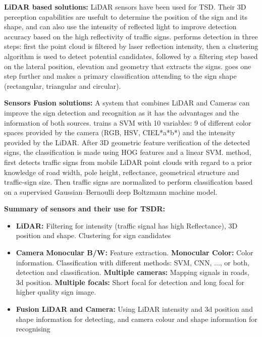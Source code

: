 \begin{flushleft} \textbf{LiDAR based solutions:}
LiDAR sensors have been used for TSD. Their 3D perception capabilities are 
usefult to determine the position of the sign and its shape, and can also use 
the intensity of reflected light to improve detection accuracy based on the
high reflectivity of traffic signs. \cite{gargoum2017automated} 
performs detection in three steps: first the point cloud is filtered by 
laser reflection intensity, then a clustering algorithm is used to detect 
potential candidates, followed by a filtering step based on the lateral 
position, elevation and geometry that extracts the signs. 
\cite{weng2016road} goes one step further and makes a primary 
classification attending to the sign shape (rectangular, triangular and 
circular).
\end{flushleft}

\begin{flushleft} \textbf{Sensors Fusion solutions:}
A system that combines LiDAR and Cameras can improve the sign detection and 
recognition as it has the advantages and the information of both sources. 
\cite{zhou2014lidar} trains a SVM with 10 variables: 9 of different color 
spaces provided by the camera (RGB, HSV, CIEL*a*b*) and the intensity provided 
by the LiDAR. After 3D geometric feature verification of the detected signs, 
the classification is made using HOG features and a linear SVM. 
\cite{guan2018robust} method, first detects traffic signs from mobile LiDAR 
point clouds with regard to a prior knowledge of road width, pole height, 
reflectance, geometrical structure and traffic-sign size. Then traffic signs 
are normalized to perform classification based on a supervised 
Gaussian–Bernoulli deep Boltzmann machine model.
\end{flushleft}

\begin{flushleft}
\textbf{Summary of sensors and their use for TSDR:}
\begin{itemize}%
\item \textbf{LiDAR:} Filtering for intensity (traffic signal has high Reflectance), 3D position and shape. Clustering for sign candidates
\item \textbf{Camera}
\subitem \textbf{Monocular B/W:} Feature extraction.
\subitem \textbf{Monocular Color:} Color information. Classification with 
different methods: SVM, CNN, ..., or both, detection and classification.
\subitem \textbf{Multiple cameras:} Mapping signals in roads, 3d position.
\subitem \textbf{Multiple focals:} Short focal for detection and long focal for higher quality sign image.
\item \textbf{Fusion LiDAR and Camera:} Using LiDAR intensity and 3d position and shape information for detecting, and camera colour and shape information for recognising
\end{itemize}
\end{flushleft}

